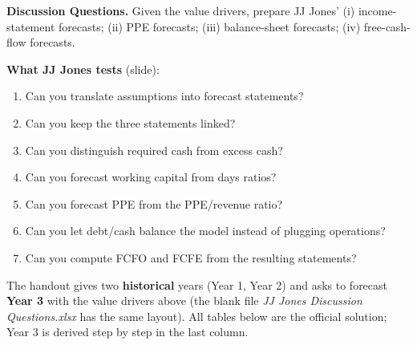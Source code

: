 \textbf{Discussion Questions.} Given the value drivers, prepare JJ Jones' (i) income-statement forecasts; (ii) PPE forecasts; (iii) balance-sheet forecasts; (iv) free-cash-flow forecasts.

\textbf{What JJ Jones tests} (slide):
\begin{enumerate}
  \item Can you translate assumptions into forecast statements?
  \item Can you keep the three statements linked?
  \item Can you distinguish required cash from excess cash?
  \item Can you forecast working capital from days ratios?
  \item Can you forecast PPE from the PPE/revenue ratio?
  \item Can you let debt/cash balance the model instead of plugging operations?
  \item Can you compute FCFO and FCFE from the resulting statements?
\end{enumerate}

\begin{exbox}
The handout gives two \textbf{historical} years (Year 1, Year 2) and asks to forecast \textbf{Year 3} with the value drivers above (the blank file \emph{JJ Jones Discussion Questions.xlsx} has the same layout). All tables below are the official solution; Year 3 is derived step by step in the last column.
\end{exbox}

